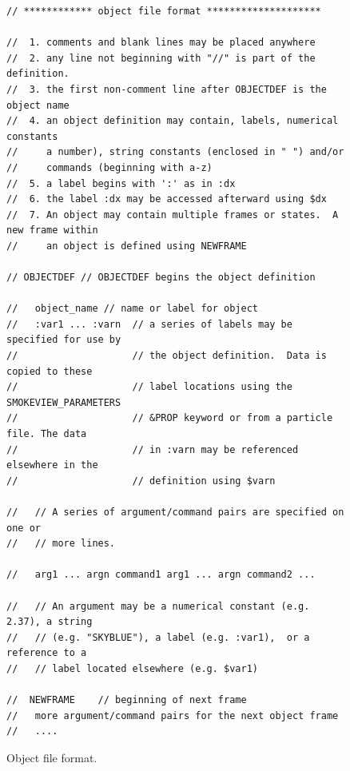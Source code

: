 \documentclass[11pt,twoside]{book}
\newcommand{\figoptions}{hbp}
\begin{document}
\begin{figure}[\figoptions]
{\small
\begin{Verbatim}[frame=single,rulecolor=\color{blue},
framerule=3pt,framesep=1pc,fillcolor=\color{yellow}]
// ************ object file format ********************

//  1. comments and blank lines may be placed anywhere
//  2. any line not beginning with "//" is part of the definition.
//  3. the first non-comment line after OBJECTDEF is the object name
//  4. an object definition may contain, labels, numerical constants
//     a number), string constants (enclosed in " ") and/or
//     commands (beginning with a-z)
//  5. a label begins with ':' as in :dx
//  6. the label :dx may be accessed afterward using $dx
//  7. An object may contain multiple frames or states.  A new frame within
//     an object is defined using NEWFRAME

// OBJECTDEF // OBJECTDEF begins the object definition

//   object_name // name or label for object
//   :var1 ... :varn  // a series of labels may be specified for use by
//                    // the object definition.  Data is copied to these
//                    // label locations using the SMOKEVIEW_PARAMETERS
//                    // &PROP keyword or from a particle file. The data
//                    // in :varn may be referenced  elsewhere in the
//                    // definition using $varn

//   // A series of argument/command pairs are specified on one or
//   // more lines.

//   arg1 ... argn command1 arg1 ... argn command2 ...

//   // An argument may be a numerical constant (e.g. 2.37), a string
//   // (e.g. "SKYBLUE"), a label (e.g. :var1),  or a reference to a
//   // label located elsewhere (e.g. $var1)

//  NEWFRAME    // beginning of next frame
//   more argument/command pairs for the next object frame
//   ....
\end{Verbatim}
}
\caption{Object file format.}
\label{figobjectdef}%
\end{figure}
\end{document}
